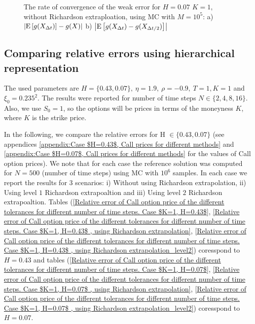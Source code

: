 \documentclass[11pt]{article}
\newcommand{\expt}[1]{\mathrm{E}\left[#1\right]}
\begin{document}
\begin{figure}
	\caption{The rate of convergence of the weak error for $H=0.07$ $K=1$, without Richardson extraploation, using MC with $M=10^5$: a) $\abs{\expt{g(X_{\Delta t})}-g(X)}$  b) $\abs{\expt{g(X_{\Delta t})-g(X_{\Delta t/2})}}$ }
	\label{fig:Weak_rate_H_007_without_rich_change_meausre}
\end{figure}

\newpage
\subsection{Comparing relative errors using hierarchical representation }


The used parameters are $H=\{0.43, 0.07\},\: \eta=1.9, \: \rho=-0.9,\: T=1, K=1$ and $\xi_0=0.235^2$. The results were reported for number of time steps $N \in \{2,4,8,16\}$.  Also, we use $S_0=1$, so the options will be prices in terms of the moneyness $K$, where $K$ is the strike price.  


In the following, we compare the  relative errors for H $\in \{0.43,0.07\}$ (see appendices \ref{appendix:Case $H=0.43$, Call prices for different methods} and \ref{appendix:Case $H=0.07$, Call prices for different methods} for the values of Call option prices). We note that for each case the reference solution was computed for $N=500$ (number of time steps) using MC with $10^6$ samples. In each case  we report the results for 3 scenarios: i) Without using Richardson extrapolation, ii) Using level $1$ Richardson extrapoaltion and  iii) Using level $2$ Richardson extrapoaltion. Tables (\ref{Relative error of Call option price of the different tolerances for different number of time steps. Case $K=1, H=0.43$}, \ref{Relative error of Call option price of the different tolerances for different number of time steps. Case $K=1, H=0.43$ , using Richardson extrapolation}, \ref{Relative error of Call option price of the different tolerances for different number of time steps. Case $K=1, H=0.43$ , using Richardson extrapolation_level2})  coresspond to $H=0.43$ and tables (\ref{Relative error of Call option price of the different tolerances for different number of time steps. Case $K=1, H=0.07$}, \ref{Relative error of Call option price of the different tolerances for different number of time steps. Case $K=1, H=0.07$ , using Richardson extrapolation}, \ref{Relative error of Call option price of the different tolerances for different number of time steps. Case $K=1, H=0.07$ , using Richardson extrapolation_level2})  coresspond to $H=0.07$.
\end{document}

